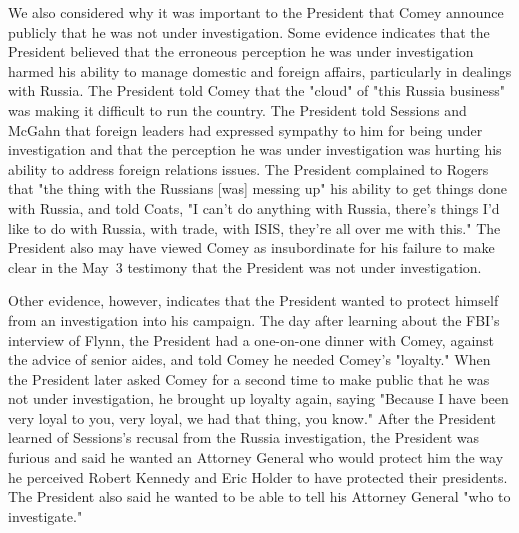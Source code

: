 We also considered why it was important to the President that Comey announce publicly that he was not under investigation.
Some evidence indicates that the President believed that the erroneous perception he was under investigation harmed his ability to manage domestic and foreign affairs, particularly in dealings with Russia.
The President told Comey that the "cloud" of "this Russia business" was making it difficult to run the country.
The President told Sessions and McGahn that foreign leaders had expressed sympathy to him for being under investigation and that the perception he was under investigation was hurting his ability to address foreign relations issues.
The President complained to Rogers that "the thing with the Russians [was] messing up" his ability to get things done with Russia, and told Coats, "I can't do anything with Russia, there's things I'd
like to do with Russia, with trade, with ISIS, they're all over me with this."
The President also may have viewed Comey as insubordinate for his failure to make clear in the May~3 testimony that the President was not under investigation.

Other evidence, however, indicates that the President wanted to protect himself from an investigation into his campaign.
The day after learning about the FBI's interview of Flynn, the President had a one-on-one dinner with Comey, against the advice of senior aides, and told Comey he needed Comey's "loyalty."
When the President later asked Comey for a second time to make public that he was not under investigation, he brought up loyalty again, saying "Because I have been very loyal to you, very loyal, we had that thing, you know."
After the President learned of Sessions's recusal from the Russia investigation, the President was furious and said he wanted an Attorney General who would protect him the way he perceived Robert Kennedy and Eric Holder to have protected their presidents.
The President also said he wanted to be able to tell his Attorney General "who to investigate."

